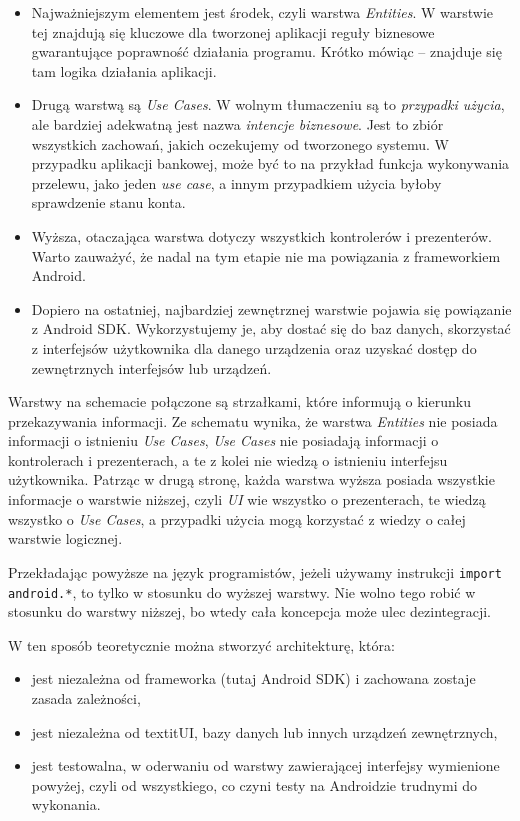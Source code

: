 \begin{itemize}

\item
Najważniejszym elementem jest środek, czyli warstwa \textit{Entities}. W warstwie tej znajdują się kluczowe dla tworzonej aplikacji reguły biznesowe gwarantujące poprawność działania programu. Krótko mówiąc – znajduje się tam logika działania aplikacji.
\item
Drugą warstwą są \textit{Use Cases}. W wolnym tłumaczeniu są to \textit{przypadki użycia}, ale bardziej adekwatną jest nazwa \textit{intencje biznesowe}. Jest to zbiór wszystkich zachowań, jakich oczekujemy od tworzonego systemu. W przypadku aplikacji bankowej, może być to na przykład funkcja wykonywania przelewu, jako jeden \textit{use case}, a innym przypadkiem użycia byłoby sprawdzenie stanu konta.
\item
Wyższa, otaczająca warstwa dotyczy wszystkich kontrolerów i prezenterów. Warto zauważyć, że nadal na tym etapie nie ma powiązania z frameworkiem Android.
\item
Dopiero na ostatniej, najbardziej zewnętrznej warstwie pojawia się powiązanie z Android SDK. Wykorzystujemy je, aby dostać się do baz danych, skorzystać z interfejsów użytkownika dla danego urządzenia oraz uzyskać dostęp do zewnętrznych interfejsów lub urządzeń.
\end{itemize}

Warstwy na schemacie połączone są strzałkami, które informują o kierunku przekazywania informacji. Ze schematu wynika, że warstwa \textit{Entities} nie posiada informacji o istnieniu \textit{Use Cases}, \textit{Use Cases} nie posiadają informacji o kontrolerach i prezenterach, a te z kolei nie wiedzą o istnieniu interfejsu użytkownika. Patrząc w drugą stronę, każda warstwa wyższa posiada wszystkie informacje o warstwie niższej, czyli \textit{UI} wie wszystko o prezenterach, te wiedzą wszystko o \textit{Use Cases}, a przypadki użycia mogą korzystać z wiedzy o całej warstwie logicznej.

Przekładając powyższe na język programistów, jeżeli używamy instrukcji \texttt{import android.*}, to tylko w stosunku do wyższej warstwy. Nie wolno tego robić w stosunku do warstwy niższej, bo wtedy cała koncepcja może ulec dezintegracji.

W ten sposób teoretycznie można stworzyć architekturę, która:
\begin{itemize}
\item
jest niezależna od frameworka (tutaj Android SDK) i zachowana zostaje zasada zależności,
\item
jest niezależna od textit{UI}, bazy danych lub innych urządzeń zewnętrznych,
\item
jest testowalna, w oderwaniu od warstwy zawierającej interfejsy wymienione powyżej, czyli od wszystkiego, co czyni testy na Androidzie trudnymi do wykonania.
\end{itemize}

